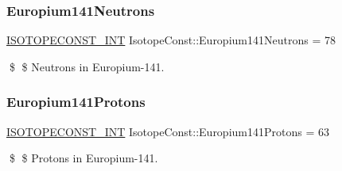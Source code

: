 \subsubsection{\texorpdfstring{Europium141\+Neutrons}{Europium141Neutrons}}
{\footnotesize\ttfamily \mbox{\hyperlink{group___isotope_const-_macros_ga5f18360b3e99483a35c32d789e62621c}{I\+S\+O\+T\+O\+P\+E\+C\+O\+N\+S\+T\+\_\+\+I\+NT}} Isotope\+Const\+::\+Europium141\+Neutrons = 78}

\$ \$ Neutrons in Europium-\/141. \mbox{\label{group___isotope_const-_europium-_eu141_ga0433ce334c0a92b2ef4964b177d4e12c}} 
\subsubsection{\texorpdfstring{Europium141\+Protons}{Europium141Protons}}
{\footnotesize\ttfamily \mbox{\hyperlink{group___isotope_const-_macros_ga5f18360b3e99483a35c32d789e62621c}{I\+S\+O\+T\+O\+P\+E\+C\+O\+N\+S\+T\+\_\+\+I\+NT}} Isotope\+Const\+::\+Europium141\+Protons = 63}

\$ \$ Protons in Europium-\/141. 